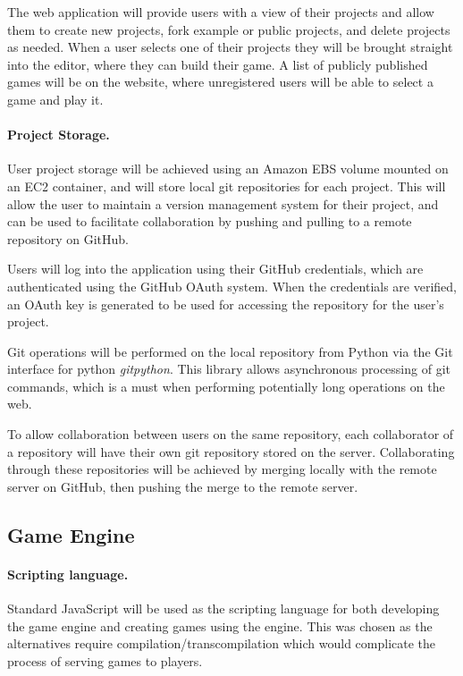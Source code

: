 \documentclass[a4paper, 12pt]{article}
\begin{document}
The web application will provide users with a view of their projects and allow them to create new projects, fork example or public projects, and delete projects as needed. When a user selects one of their projects they will be brought straight into the editor, where they can build their game. A list of publicly published games will be on the website, where unregistered users will be able to select a game and play it.

\paragraph{Project Storage.}
User project storage will be achieved using an Amazon EBS volume mounted on an EC2 container, and will store local git repositories for each project. This will allow the user to maintain a version management system for their project, and can be used to facilitate collaboration by pushing and pulling to a remote repository on GitHub.

Users will log into the application using their GitHub credentials, which are authenticated using the GitHub OAuth system. When the credentials are verified, an OAuth key is generated to be used for accessing the repository for the user's project.

Git operations will be performed on the local repository from Python via the Git interface for python \emph{gitpython}. This library allows asynchronous processing of git commands, which is a must when performing potentially long operations on the web.

To allow collaboration between users on the same repository, each collaborator of a repository will have their own git repository stored on the server. Collaborating through these repositories will be achieved by merging locally with the remote server on GitHub, then pushing the merge to the remote server.

\subsection{Game Engine}
\paragraph{Scripting language.}
Standard JavaScript will be used as the scripting language for both developing the game engine and creating games using the engine. This was chosen as the alternatives require compilation/transcompilation which would complicate the process of serving games to players.
\end{document}
